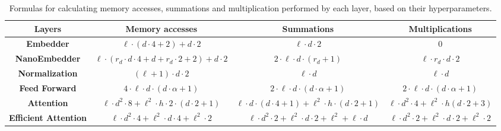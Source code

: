 \begin{table*}[htbp]
    \caption{Formulas for calculating memory accesses, summations and multiplication performed by each layer, based on their hyperparameters.}
    \centering
    
        \begin{tabular}{|c | c c c|}
        \hline
        \textbf{Layers} & \textbf{Memory accesses} & \textbf{Summations} & \textbf{Multiplications} \\
        \hline \hline
                
        \textbf{Embedder}               & \(\ell \cdot (d \cdot 4 + 2) + d \cdot 2\)  
                                        & \(\ell \cdot d \cdot 2\) 
                                        & 0   \\
        
        \textbf{NanoEmbedder}           & \(\ell \cdot (r_d \cdot d \cdot 4 + d + r_d \cdot 2 + 2) + d \cdot 2\)    
                                        & \(2 \cdot \ell \cdot d \cdot (r_d + 1)\)
                                        & \(\ell \cdot r_d \cdot d \cdot 2\) \\ 

        \textbf{Normalization}          & \((\ell+1) \cdot d \cdot 2\)    
                                        & \(\ell \cdot d\)
                                        & \(\ell \cdot d\)\\
                                        
        \textbf{Feed Forward}           & \(4 \cdot \ell \cdot d \cdot (d \cdot \alpha + 1)\)
                                        & \(2 \cdot \ell \cdot d \cdot (d \cdot \alpha + 1)\)
                                        & \(2 \cdot \ell \cdot d \cdot (d \cdot \alpha + 1)\) \\
        
        \textbf{Attention}              & \(\ell \cdot d^2 \cdot 8 + \ell^2 \cdot h \cdot 2 \cdot (d \cdot 2 + 1)\)
                                        & \(\ell \cdot d \cdot (d \cdot 4 + 1) + \ell^2 \cdot h \cdot (d \cdot 2 + 1)\)
                                        & \(\ell \cdot d^2 \cdot 4 + \ell^2 \cdot h (d \cdot 2 + 3)\)\\
        
        \textbf{Efficient Attention}    & \(\ell \cdot d^2 \cdot 4 + \ell^2 \cdot d \cdot 4 + \ell^2 \cdot 2\)    
                                        & \(\ell \cdot d^2 \cdot 2 + \ell^2 \cdot d \cdot 2 + \ell^2 + \ell \cdot d \)
                                        & \(\ell \cdot d^2 \cdot 2 + \ell^2 \cdot d \cdot 2 + \ell^2 \cdot 2\)\\        
                         
        \hline
        \end{tabular}

    \label{table:complexity}
    
\end{table*}